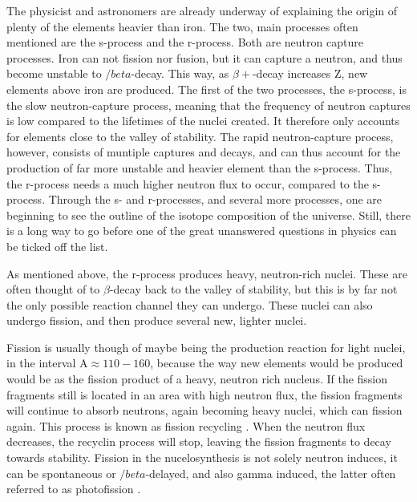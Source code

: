 \documentclass[]{article}
\begin{document}
The physicist and astronomers are already underway of explaining the origin of plenty of the elements heavier than iron. The two, main processes often mentioned are the s-process and the r-process. Both are neutron capture processes. Iron can not fission nor fusion, but it can capture a neutron, and thus become unstable to $/beta$-decay. This way, as $\beta+$-decay increases Z, new elements above iron are produced. The first of the two processes, the s-process, is the slow neutron-capture process, meaning that the frequency of neutron captures is low compared to the lifetimes of the nuclei created. It therefore only accounts for elements close to the valley of stability. The rapid neutron-capture process, however, consists of muntiple captures and decays, and can thus account for the production of far more unstable and heavier element than the s-process. Thus, the r-process needs a much higher neutron flux to occur, compared to the s-process. Through the s- and r-processes, and several more processes, one are beginning to see the outline of the isotope composition of the universe. Still, there is a long way to go before one of the great unanswered questions in physics can be ticked off the list.

\par 
\vspace{3mm}

As mentioned above, the r-process produces heavy, neutron-rich nuclei. These are often thought of to $\beta$-decay back to the valley of stability, but this is by far not the only possible reaction channel they can undergo. These nuclei can also undergo fission, and then produce several new, lighter nuclei.

Fission is usually though of maybe being the production reaction for light nuclei, in the interval A$\approx 110 - 160$, because the way new elements would be produced would be as the fission product of a heavy, neutron rich nucleus. If the fission fragments still is located in an area with high neutron flux, the fission fragments will continue to absorb neutrons, again becoming heavy nuclei, which can fission again. This process is known as fission recycling \cite{Goriely2017}. When the neutron flux decreases, the recyclin process will stop, leaving the fission fragments to decay towards stability. Fission in the nucelosynthesis is not solely neutron induces, it can be spontaneous or $/beta$-delayed, and also gamma induced, the latter often referred to as photofission \cite{Goriely2017}. 

\par 
\vspace{3mm}
\end{document}
